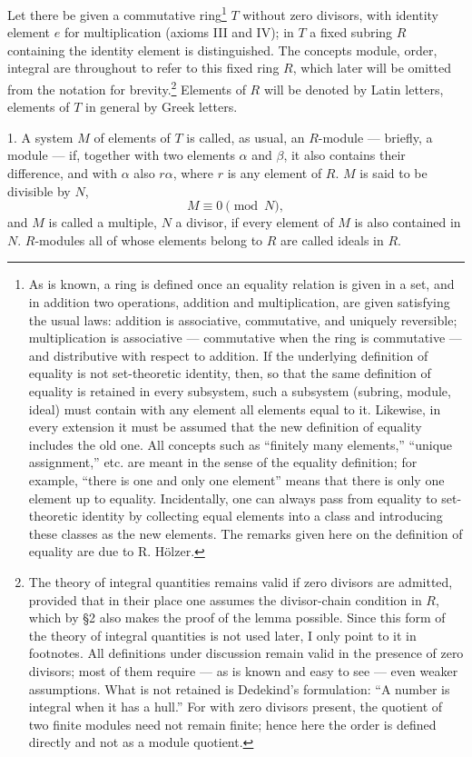 \documentclass[11pt]{article}
\begin{document}
Let there be given a commutative ring\footnote{As is known, a ring is defined once
an equality relation is given in a set, and in addition two operations, addition and
multiplication, are given satisfying the usual laws: addition is associative,
commutative, and uniquely reversible; multiplication is associative — commutative
when the ring is commutative — and distributive with respect to addition. If the
underlying definition of equality is not set-theoretic identity, then, so that the same
definition of equality is retained in every subsystem, such a subsystem (subring,
module, ideal) must contain with any element all elements equal to it. Likewise,
in every extension it must be assumed that the new definition of equality includes
the old one. All concepts such as “finitely many elements,” “unique assignment,”
etc. are meant in the sense of the equality definition; for example, “there is one and
only one element” means that there is only one element up to equality. Incidentally,
one can always pass from equality to set-theoretic identity by collecting equal
elements into a class and introducing these classes as the new elements. The remarks
given here on the definition of equality are due to R. Hölzer.} $T$ without zero
divisors, with identity element $e$ for multiplication (axioms III and IV); in $T$
a fixed subring $R$ containing the identity element is distinguished. The concepts
module, order, integral are throughout to refer to this fixed ring $R$, which later
will be omitted from the notation for brevity.\footnote{The theory of integral
quantities remains valid if zero divisors are admitted, provided that in their place
one assumes the divisor-chain condition in $R$, which by §2 also makes the proof
of the lemma possible. Since this form of the theory of integral quantities is not
used later, I only point to it in footnotes. All definitions under discussion remain
valid in the presence of zero divisors; most of them require — as is known and
easy to see — even weaker assumptions. What is not retained is Dedekind's formulation:
“A number is integral when it has a hull.” For with zero divisors present, the
quotient of two finite modules need not remain finite; hence here the order is
defined directly and not as a module quotient.} Elements of $R$ will be denoted
by Latin letters, elements of $T$ in general by Greek letters.

1. A system $M$ of elements of $T$ is called, as usual, an $R$-module — briefly,
a module — if, together with two elements $\alpha$ and $\beta$, it also contains their
difference, and with $\alpha$ also $r\alpha$, where $r$ is any element of $R$.
$M$ is said to be divisible by $N$,
\[
        M\equiv 0 \pmod N,
\]
and $M$ is called a multiple, $N$ a divisor, if every element of $M$ is also contained
in $N$. $R$-modules all of whose elements belong to $R$ are called ideals in $R$.
\end{document}
